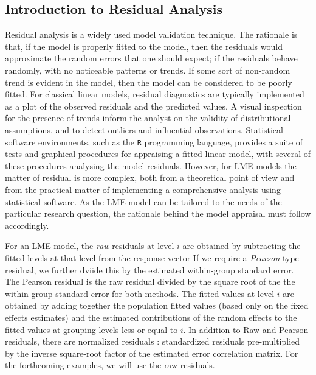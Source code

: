 \documentclass[12pt, a4paper]{report}
\theoremstyle{plain}
\theoremstyle{definition}
\theoremstyle{remark}
\begin{document}
	\subsection{Introduction to Residual Analysis}
	Residual analysis is a widely used model validation technique. The rationale is that, if the model is properly fitted to the model, then the residuals would approximate the random errors that one should expect; if the residuals behave randomly, with no noticeable patterns or trends. If some sort of non-random trend is evident in the model, then the model can be considered to be poorly fitted. 	For classical linear models, residual diagnostics are typically implemented as a plot of the observed residuals and the predicted values. A visual inspection for the presence of trends inform the analyst on the validity of distributional assumptions, and to detect outliers and influential observations. Statistical software environments, such as the \texttt{R} programming language, provides a suite of tests and graphical procedures for appraising a fitted linear model, with several of these procedures analysing the model residuals. 	However, for LME models the matter of residual is more complex, both from a theoretical point of view and from the practical matter of implementing a comprehensive analysis using statistical software. As the LME model can be tailored to the needs of the particular research question, the rationale behind the model appraisal must follow accordingly.
	
		
	For an LME model, the \textit{raw} residuals at level $i$ are obtained by subtracting the fitted levels at that level from the response vector If we require a \textit{Pearson} type residual, we further dviide this by the estimated within-group standard error. The Pearson residual is the raw residual divided by the square root of the the within-group standard error for both methods. The fitted values at level $i$ are obtained by adding together the population fitted values (based only on the fixed effects estimates) and the estimated contributions of the random effects to the fitted values at grouping levels less or equal to $i$. In addition to Raw and Pearson residuals, there are normalized residuals : standardized residuals pre-multiplied by the inverse square-root factor of the estimated error correlation matrix. For the forthcoming examples, we will use the raw residuals.
	
\end{document}
